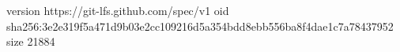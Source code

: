 version https://git-lfs.github.com/spec/v1
oid sha256:3e2e319f5a471d9b03e2cc109216d5a354bdd8ebb556ba8f4dae1c7a78437952
size 21884
